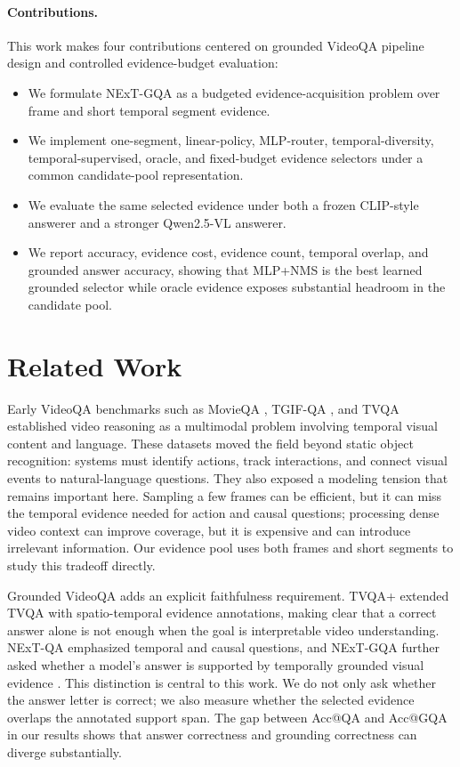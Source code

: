 \documentclass{article}
\begin{document}
\paragraph{Contributions.}
This work makes four contributions centered on grounded VideoQA pipeline design and controlled evidence-budget evaluation:
\begin{itemize}
  \item We formulate NExT-GQA as a budgeted evidence-acquisition problem over frame and short temporal segment evidence.
  \item We implement one-segment, linear-policy, MLP-router, temporal-diversity, temporal-supervised, oracle, and fixed-budget evidence selectors under a common candidate-pool representation.
  \item We evaluate the same selected evidence under both a frozen CLIP-style answerer and a stronger Qwen2.5-VL answerer.
  \item We report accuracy, evidence cost, evidence count, temporal overlap, and grounded answer accuracy, showing that MLP+NMS is the best learned grounded selector while oracle evidence exposes substantial headroom in the candidate pool.
\end{itemize}

\section{Related Work}
Early VideoQA benchmarks such as MovieQA \citep{tapaswi2016movieqa}, TGIF-QA \citep{jang2017tgifqa}, and TVQA \citep{lei2018tvqa} established video reasoning as a multimodal problem involving temporal visual content and language. These datasets moved the field beyond static object recognition: systems must identify actions, track interactions, and connect visual events to natural-language questions. They also exposed a modeling tension that remains important here. Sampling a few frames can be efficient, but it can miss the temporal evidence needed for action and causal questions; processing dense video context can improve coverage, but it is expensive and can introduce irrelevant information. Our evidence pool uses both frames and short segments to study this tradeoff directly.

Grounded VideoQA adds an explicit faithfulness requirement. TVQA+ \citep{lei2019tvqaplus} extended TVQA with spatio-temporal evidence annotations, making clear that a correct answer alone is not enough when the goal is interpretable video understanding. NExT-QA \citep{xiao2021nextqa} emphasized temporal and causal questions, and NExT-GQA further asked whether a model's answer is supported by temporally grounded visual evidence \citep{xiao2023trust}. This distinction is central to this work. We do not only ask whether the answer letter is correct; we also measure whether the selected evidence overlaps the annotated support span. The gap between Acc@QA and Acc@GQA in our results shows that answer correctness and grounding correctness can diverge substantially.
\end{document}
